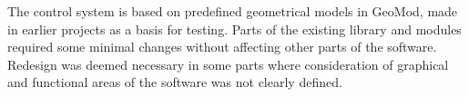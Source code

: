 The control system is based on predefined geometrical models in GeoMod, made in earlier projects as a basis for testing. Parts of the existing library and modules required some minimal changes without affecting other parts of the software. Redesign was deemed necessary in some parts where consideration of graphical and functional areas of the software was not clearly defined.